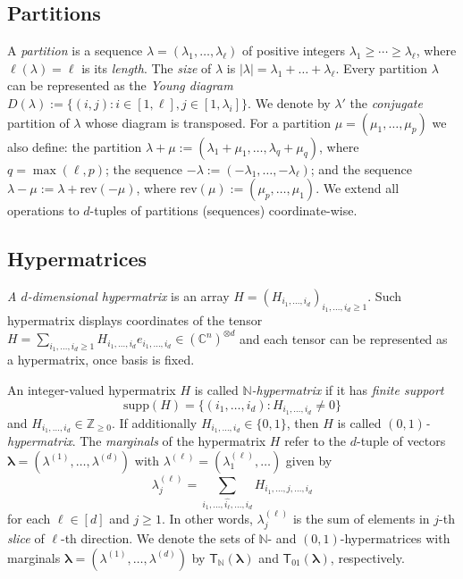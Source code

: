 \documentclass[12pt, reqno]{amsart}
\theoremstyle{definition}
\begin{document}
\subsection{Partitions} A {\it partition} is a sequence $\lambda = (\lambda_{1}, \ldots, \lambda_{\ell})$ of positive integers $\lambda_1 \ge \cdots \ge \lambda_{\ell}$, where $\ell(\lambda) = \ell$ is its {\it length}. The {\it size} of $\lambda$ is $|\lambda| = \lambda_1 + \ldots + \lambda_{\ell}$. Every partition $\lambda$ can be represented as the {\it Young diagram} $D(\lambda):=\{(i,j)  : i \in [1, \ell], j\in [1,\lambda_{i}]\}$. We denote by $\lambda'$ the {\it conjugate} partition of $\lambda$ whose diagram is transposed. For a partition $\mu = (\mu_1,\ldots,\mu_p)$ we also define: the partition $\lambda + \mu := (\lambda_1 + \mu_1,\ldots,\lambda_q + \mu_q)$, where $q = \max(\ell, p)$; the sequence $-\lambda := (-\lambda_1,\ldots,-\lambda_\ell)$; and the sequence $\lambda - \mu := \lambda + \mathrm{rev}(-\mu)$, where $\mathrm{rev}(\mu) := (\mu_p,\ldots,\mu_1)$. We extend all operations to $d$-tuples of partitions (sequences) coordinate-wise. 

\subsection{Hypermatrices}

\textit{A $d$-dimensional hypermatrix} is %
an array $H = (H_{i_1,\ldots,i_d})_{i_1, \ldots, i_d \ge 1}$. %
Such hypermatrix displays coordinates of the tensor $H = \sum_{i_1,\ldots,i_d \ge 1} H_{i_1,\ldots,i_d} e_{i_1,\ldots,i_d} \in (\mathbb{C}^n)^{\otimes d}$ and each tensor can be represented as a hypermatrix, once basis is fixed. 

An integer-valued hypermatrix $H$ is called \textit{$\mathbb{N}$-hypermatrix} if it has \textit{finite support} $$\mathrm{supp}(H) = \{ (i_1,\ldots,i_d): H_{i_1,\ldots,i_d} \neq 0 \}$$ and $H_{i_1,\ldots,i_d} \in \mathbb{Z}_{\ge 0}$. If additionally $H_{i_1,\ldots,i_d} \in \{0, 1\}$, then $H$ is called \textit{$(0,1)$-hypermatrix}. 
The \textit{marginals} of the hypermatrix $H$ refer to the $d$-tuple of vectors $\pmb{\lambda} = (\lambda^{(1)},\ldots,\lambda^{(d)})$ with $\lambda^{(\ell)} = (\lambda^{(\ell)}_1, \ldots )$ given by 
$$
\lambda^{(\ell)}_j = \sum_{i_1,\ldots,\widehat{i_\ell},\ldots,i_d} H_{i_1,\ldots,j, \ldots, i_d}
$$
for each $\ell \in [d]$ and $j \ge 1$. In other words, $\lambda^{(\ell)}_j$ is the sum of elements in $j$-th {\it slice} of $\ell$-th direction.
We denote the sets of $\mathbb{N}$- and $(0,1)$-hypermatrices with marginals $\pmb{\lambda} = (\lambda^{(1)},\ldots,\lambda^{(d)})$ by $\mathsf{T}_{\mathbb{N}}(\pmb{\lambda})$ and $\mathsf{T}_{01}(\pmb{\lambda})$, respectively. 
\end{document}
